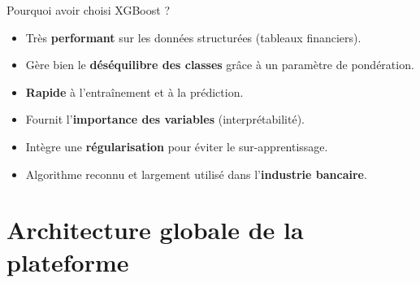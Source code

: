 \documentclass[10pt,aspectratio=169]{beamer}
\begin{document}
\begin{frame}{Pourquoi avoir choisi XGBoost ?}
  \begin{itemize}
    \item Très \textbf{performant} sur les données structurées (tableaux
          financiers).
    \pause
    \item Gère bien le \textbf{déséquilibre des classes} grâce à un
          paramètre de pondération.
    \pause
    \item \textbf{Rapide} à l'entraînement et à la prédiction.
    \pause
    \item Fournit l'\textbf{importance des variables}
          (interprétabilité).
    \pause
    \item Intègre une \textbf{régularisation} pour éviter le
          sur-apprentissage.
    \pause
    \item Algorithme reconnu et largement utilisé dans l'\textbf{industrie
          bancaire}.
  \end{itemize}
\end{frame}

\section{Architecture globale de la plateforme}
\end{document}
